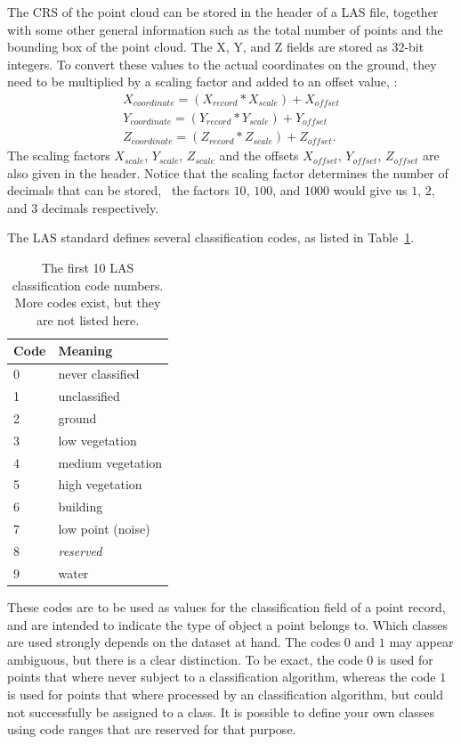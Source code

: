 The CRS of the point cloud can be stored in the header of a LAS file, together with some other general information such as the total number of points and the bounding box of the point cloud. 
The X, Y, and Z fields are stored as 32-bit integers. 
To convert these values to the actual coordinates on the ground, they need to be multiplied by a scaling factor and added to an offset value, \ie:
\begin{gather*}
  X_{coordinate} = (X_{record} * X_{scale}) + X_{offset} \\
  Y_{coordinate} = (Y_{record} * Y_{scale}) + Y_{offset} \\
  Z_{coordinate} = (Z_{record} * Z_{scale}) + Z_{offset}.
\end{gather*}
The scaling factors $X_{scale}$, $Y_{scale}$, $Z_{scale}$ and the offsets $X_{offset}$, $Y_{offset}$, $Z_{offset}$ are also given in the header. Notice that the scaling factor determines the number of decimals that can be stored, \eg\ the factors $10$, $100$, and $1000$ would give us $1$, $2$, and $3$ decimals respectively.

The LAS standard defines several classification codes, as listed in Table~\ref{tab:las-classes}.
\begin{table}
  \centering
\begin{tabular}{l|l}
  Code & Meaning \\ \midrule
  0 & never classified \\
  1 & unclassified \\
  2 & ground \\
  3 & low vegetation \\
  4 & medium vegetation \\
  5 & high vegetation \\
  6 & building \\
  7 & low point (noise) \\
  8 & \emph{reserved} \\
  9 & water \\
\end{tabular}
\caption{The first 10 LAS classification code numbers. More codes exist, but they are not listed here.}
\label{tab:las-classes}
\end{table}
These codes are to be used as values for the classification field of a point record, and are intended to indicate the type of object a point belongs to.
Which classes are used strongly depends on the dataset at hand.
The codes $0$ and $1$ may appear ambiguous, but there is a clear distinction.
To be exact, the code $0$ is used for points that where never subject to a classification algorithm, whereas the code $1$ is used for points that where processed by an classification algorithm, but could not successfully be assigned to a class.
It is possible to define your own classes using code ranges that are reserved for that purpose.


